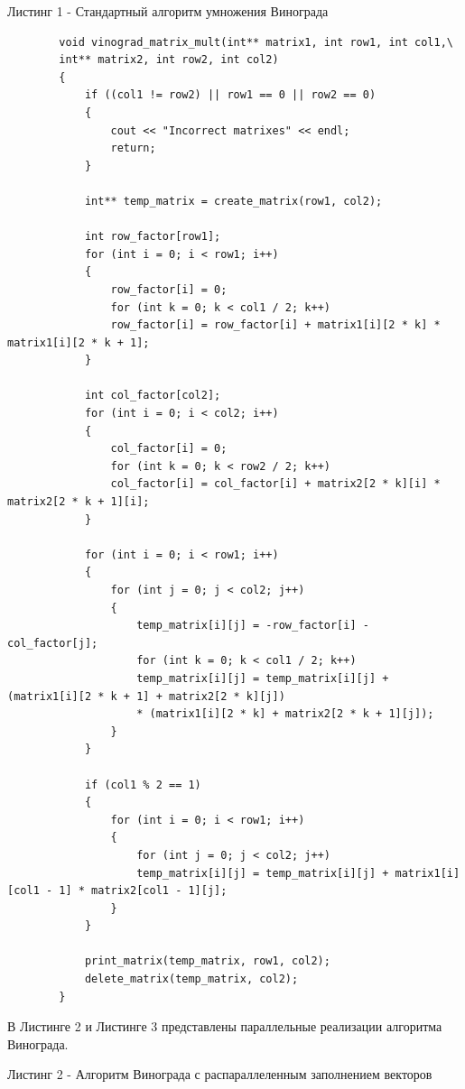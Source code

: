 \documentclass[14pt, a4paper]{extarticle}
\begin{document}
	Листинг 1 -	Стандартный алгоритм умножения Винограда
	\begin{lstlisting}
		void vinograd_matrix_mult(int** matrix1, int row1, int col1,\
		int** matrix2, int row2, int col2)
		{
			if ((col1 != row2) || row1 == 0 || row2 == 0)
			{
				cout << "Incorrect matrixes" << endl;
				return;
			}
			
			int** temp_matrix = create_matrix(row1, col2);
			
			int row_factor[row1];
			for (int i = 0; i < row1; i++)
			{
				row_factor[i] = 0;
				for (int k = 0; k < col1 / 2; k++)
				row_factor[i] = row_factor[i] + matrix1[i][2 * k] * matrix1[i][2 * k + 1];
			}
			
			int col_factor[col2];
			for (int i = 0; i < col2; i++)
			{
				col_factor[i] = 0;
				for (int k = 0; k < row2 / 2; k++)
				col_factor[i] = col_factor[i] + matrix2[2 * k][i] * matrix2[2 * k + 1][i];
			}
			
			for (int i = 0; i < row1; i++)
			{
				for (int j = 0; j < col2; j++)
				{
					temp_matrix[i][j] = -row_factor[i] - col_factor[j];
					for (int k = 0; k < col1 / 2; k++)
					temp_matrix[i][j] = temp_matrix[i][j] + (matrix1[i][2 * k + 1] + matrix2[2 * k][j])
					* (matrix1[i][2 * k] + matrix2[2 * k + 1][j]);
				}
			}
			
			if (col1 % 2 == 1)
			{
				for (int i = 0; i < row1; i++)
				{
					for (int j = 0; j < col2; j++)
					temp_matrix[i][j] = temp_matrix[i][j] + matrix1[i][col1 - 1] * matrix2[col1 - 1][j];
				}
			}
			
			print_matrix(temp_matrix, row1, col2);
			delete_matrix(temp_matrix, col2);
		}
	\end{lstlisting}
	\newpage
	
	В Листинге 2 и Листинге 3 представлены параллельные реализации алгоритма Винограда.
	
	\begin{center}
		Листинг 2 - Алгоритм Винограда с распараллеленным заполнением векторов
	\end{center}
	
\end{document}
